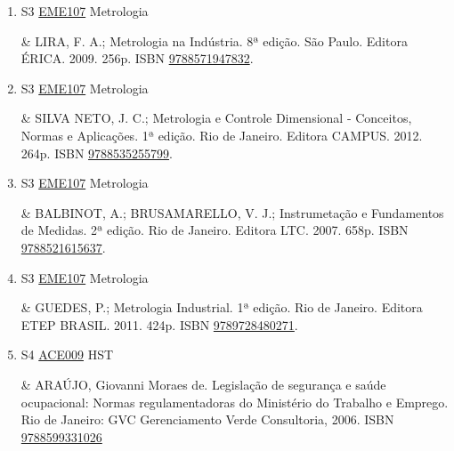\documentclass[12pt,a4paper]{book}
\begin{document}
\begin{enumerate}
& ALBERTAZZI, A.;  SOUSA, A.  R.;  Fundamentos de Metrologia Científica e Industrial.  1ª edição.  Barueri.  Editora MANOLE.  2008.  408p.  ISBN \href{http://www.bn.br/site/pages/servicosProfissionais/agenciaISBN/isbnBusca/FbnBuscaISBNCatalogo.asp?pField=ISBN&pIntPagina=1&pISBN=20421161&nidbISBN=true&hidbISBN=true}{9788520421161}. 
 

 \item S3 \hyperref[PUD:EME107]{EME107} Metrologia

& LIRA, F.  A.;  Metrologia na Indústria.  8ª edição.  São Paulo.  Editora ÉRICA.  2009.  256p.  ISBN \href{http://www.bn.br/site/pages/servicosProfissionais/agenciaISBN/isbnBusca/FbnBuscaISBNCatalogo.asp?pField=ISBN&pIntPagina=1&pISBN=71947832&nidbISBN=true&hidbISBN=true}{9788571947832}. 
 

 \item S3 \hyperref[PUD:EME107]{EME107} Metrologia

&  SILVA NETO, J.  C.;  Metrologia e Controle Dimensional - Conceitos, Normas e Aplicações.  1ª edição.  Rio de Janeiro.  Editora CAMPUS.  2012.  264p.  ISBN \href{http://www.bn.br/site/pages/servicosProfissionais/agenciaISBN/isbnBusca/FbnBuscaISBNCatalogo.asp?pField=ISBN&pIntPagina=1&pISBN=35255799&nidbISBN=true&hidbISBN=true}{9788535255799}.
 \item S3 \hyperref[PUD:EME107]{EME107} Metrologia

& BALBINOT, A.;  BRUSAMARELLO, V.  J.;  Instrumetação e Fundamentos de Medidas.  2ª edição.  Rio de Janeiro.  Editora LTC.  2007.  658p.  ISBN \href{http://www.bn.br/site/pages/servicosProfissionais/agenciaISBN/isbnBusca/FbnBuscaISBNCatalogo.asp?pField=ISBN&pIntPagina=1&pISBN=21615637&nidbISBN=true&hidbISBN=true}{9788521615637}. 
 

 \item S3 \hyperref[PUD:EME107]{EME107} Metrologia

&  GUEDES, P.;  Metrologia Industrial.  1ª edição.  Rio de Janeiro.  Editora ETEP BRASIL.  2011.  424p.  ISBN \href{http://www.google.com/search?hl=pt-BR&tbo=p&tbm=bks&q=isbn:9789728480271&num=10}{9789728480271}.
 \item S4 \hyperref[PUD:ACE009]{ACE009} HST

&   ARAÚJO, Giovanni Moraes de.  Legislação de segurança e saúde ocupacional: Normas regulamentadoras do Ministério do Trabalho e Emprego.  Rio de Janeiro: GVC Gerenciamento Verde Consultoria, 2006.  ISBN \href{http://www.bn.br/site/pages/servicosProfissionais/agenciaISBN/isbnBusca/FbnBuscaISBNCatalogo.asp?pField=ISBN&pIntPagina=1&pISBN=99331026&nidbISBN=true&hidbISBN=true}{9788599331026}
 


\end{enumerate}
\end{document}
